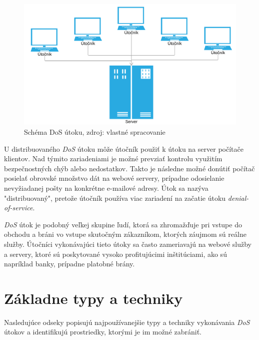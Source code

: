 \documentclass[
  printed, %
  table,   %
  lof,     %
  lot,     %
]{fithesis3}
\begin{document}
\begin{figure}[h]
  \centering
    \includegraphics[width=\textwidth]{images/dos.png}
  \caption{Schéma DoS útoku, zdroj: vlastné spracovanie}
  \label{fig:cs-basic}
\end{figure}

U distribuovaného \textit{DoS} útoku môže útočník použiť k útoku na server
počítače klientov. Nad týmito zariadeniami je možné prevziať kontrolu využitím
bezpečnostných chýb alebo nedostatkov. Takto je následne možné donútiť počítač
posielať obrovské množstvo dát na webové servery, prípadne odosielanie nevyžiadanej
pošty na konkrétne e-mailové adresy. Útok sa nazýva "distribuovaný", pretože útočník
používa viac zariadení na začatie útoku \textit{denial-of-service}.

\textit{DoS} útok je podobný veľkej skupine ľudí, ktorá sa zhromažďuje pri vstupe do
obchodu a bráni vo vstupe skutočným zákazníkom, ktorých záujmom sú reálne služby.
Útočníci vykonávajúci tieto útoky sa často zameriavajú na webové služby a servery,
ktoré sú poskytované vysoko profitujúcimi inštitúciami, ako sú napríklad banky,
prípadne platobné brány.

\section{Základne typy a techniky}
Nasledujúce odseky popisujú najpoužívanejšie typy a techniky vykonávania \textit{DoS}
útokov a identifikujú prostriedky, ktorými je im možné zabrániť.
\end{document}
